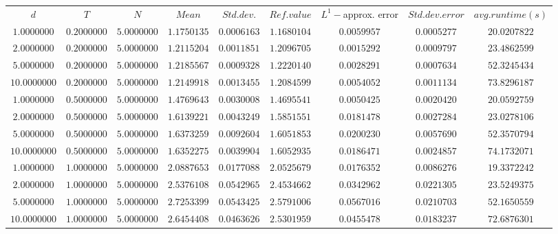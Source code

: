 \begin{tabular}{ccccccccc}
$d$ & $T$ & $N$ & $Mean$ & $Std. dev.$ & $Ref. value$ & $L^1-$approx. error & $Std. dev. error$ & $avg. runtime (s)$\\
$1.0000000$ & $0.2000000$ & $5.0000000$ & $1.1750135$ & $0.0006163$ & $1.1680104$ & $0.0059957$ & $0.0005277$ & $20.0207822$\\
$2.0000000$ & $0.2000000$ & $5.0000000$ & $1.2115204$ & $0.0011851$ & $1.2096705$ & $0.0015292$ & $0.0009797$ & $23.4862599$\\
$5.0000000$ & $0.2000000$ & $5.0000000$ & $1.2185567$ & $0.0009328$ & $1.2220140$ & $0.0028291$ & $0.0007634$ & $52.3245434$\\
$10.0000000$ & $0.2000000$ & $5.0000000$ & $1.2149918$ & $0.0013455$ & $1.2084599$ & $0.0054052$ & $0.0011134$ & $73.8296187$\\
$1.0000000$ & $0.5000000$ & $5.0000000$ & $1.4769643$ & $0.0030008$ & $1.4695541$ & $0.0050425$ & $0.0020420$ & $20.0592759$\\
$2.0000000$ & $0.5000000$ & $5.0000000$ & $1.6139221$ & $0.0043249$ & $1.5851551$ & $0.0181478$ & $0.0027284$ & $23.0278106$\\
$5.0000000$ & $0.5000000$ & $5.0000000$ & $1.6373259$ & $0.0092604$ & $1.6051853$ & $0.0200230$ & $0.0057690$ & $52.3570794$\\
$10.0000000$ & $0.5000000$ & $5.0000000$ & $1.6352275$ & $0.0039904$ & $1.6052935$ & $0.0186471$ & $0.0024857$ & $74.1732071$\\
$1.0000000$ & $1.0000000$ & $5.0000000$ & $2.0887653$ & $0.0177088$ & $2.0525679$ & $0.0176352$ & $0.0086276$ & $19.3372242$\\
$2.0000000$ & $1.0000000$ & $5.0000000$ & $2.5376108$ & $0.0542965$ & $2.4534662$ & $0.0342962$ & $0.0221305$ & $23.5249375$\\
$5.0000000$ & $1.0000000$ & $5.0000000$ & $2.7253399$ & $0.0543425$ & $2.5791006$ & $0.0567016$ & $0.0210703$ & $52.1650559$\\
$10.0000000$ & $1.0000000$ & $5.0000000$ & $2.6454408$ & $0.0463626$ & $2.5301959$ & $0.0455478$ & $0.0183237$ & $72.6876301$\\
\end{tabular}
